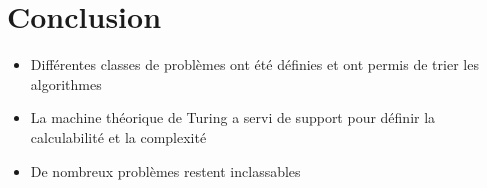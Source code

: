 \documentclass[12pt]{article}   %
\begin{document}
\section{Conclusion}
\begin{itemize}
	\item Différentes classes de problèmes ont été définies et ont permis de trier les algorithmes
	\item La machine théorique de Turing a servi de support pour définir la calculabilité et la complexité
	\item De nombreux problèmes restent inclassables
\end{itemize}
\end{document}
